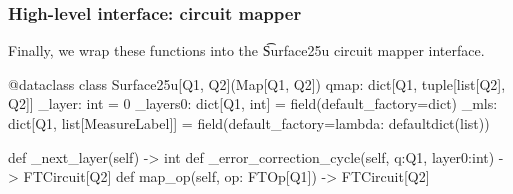 \subsubsection{High-level interface: circuit mapper}

Finally, we wrap these functions into the \t{Surface25u} circuit mapper interface.

  \begin{python}
  @dataclass
  class Surface25u[Q1, Q2](Map[Q1, Q2])
    qmap: dict[Q1, tuple[list[Q2], Q2]]
    _layer: int = 0
    _layers0: dict[Q1, int] = field(default_factory=dict)
    _mls: dict[Q1, list[MeasureLabel]] = field(default_factory=lambda: defaultdict(list))

    def _next_layer(self) -> int
    def _error_correction_cycle(self, q:Q1, layer0:int) -> FTCircuit[Q2]
    def map_op(self, op: FTOp[Q1]) -> FTCircuit[Q2]
  \end{python}

% 

